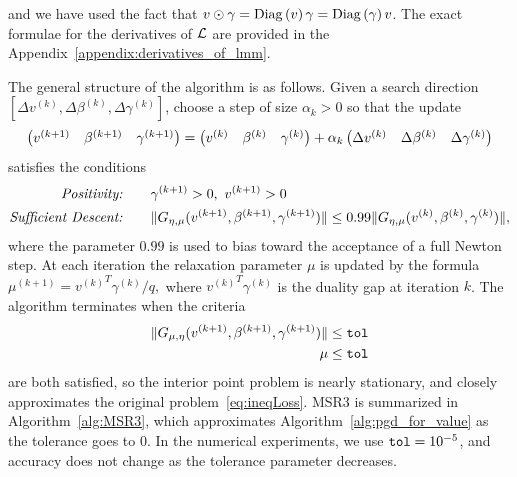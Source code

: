and we have used the fact that  $v\odot \gamma=\mathrm{Diag}\left(v\right)\gamma=\mathrm{Diag}\left(\gamma\right)v$. 
The exact formulae for the derivatives of $\operatorname{\mathcal{L}}$ are provided in the Appendix~\ref{appendix:derivatives_of_lmm}.

The general structure of the algorithm is as follows.
Given a search direction
$[\Delta v^{(k)}, \Delta \beta^{(k)}, \Delta \gamma^{(k)}]$, 
choose a step of size $\alpha_k>0$
so that the update
\[
\begin{pmatrix}
v^{(k+1)}& \beta^{(k+1)}& \gamma^{(k+1)}
\end{pmatrix}
=
\begin{pmatrix}
v^{(k)}& \beta^{(k)} &\gamma^{(k)}
\end{pmatrix}
+\alpha_k
\begin{pmatrix}
\Delta v^{(k)} & \Delta\beta^{(k)}& \Delta\gamma^{(k)}
\end{pmatrix}
\]
satisfies the conditions
\[
\begin{aligned}
	\text{\textit{Positivity:}} \qquad & \gamma^{(k+1)} > 0,\ v^{(k+1)} > 0 \\
	\text{\textit{Sufficient Descent:}}\qquad & \| G_\emu(v^{(k+1)}, \beta^{(k+1)}, \gamma^{(k+1)})\| \leq 0.99\|G_\emu(v^{(k)}, \beta^{(k)}, \gamma^{(k)})\|,
\end{aligned}
\]
where the parameter $0.99$ is used to bias toward the acceptance of a full Newton step.
At each iteration the relaxation parameter $\mu$ is updated by the formula 
\( %
    \mu^{(k+1)} = {v^{(k)}}^T\gamma^{(k)}/q,
\) %
where ${v^{(k)}}^T\gamma^{(k)}$ is the duality gap at
iteration $k$. The algorithm terminates when the criteria 
\[
\begin{aligned}
\|G_{\mu,\eta}(v^{(k+1)}, \beta^{(k+1)}, \gamma^{(k+1)})\| &\leq \text{\texttt{tol}}\\
\mu &\leq  \text{\texttt{tol}} 
\end{aligned}
\]
are both satisfied, so the interior point problem is nearly stationary, and closely approximates the original problem~\eqref{eq:ineqLoss}.
MSR3 is summarized in Algorithm~\ref{alg:MSR3}, which approximates Algorithm~\ref{alg:pgd_for_value} as the tolerance goes to $0$. 
In the numerical experiments, we use $\text{\texttt{tol}} = 10^{-5}$, and accuracy does not change as the tolerance parameter decreases.  

